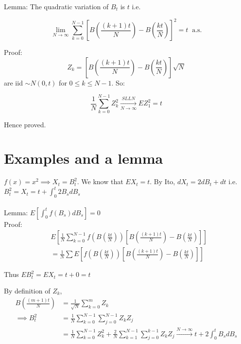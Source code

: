 \documentclass{article}
\begin{document}
Lemma: The quadratic variation of $B_t$ is $t$ i.e.

$$\lim_{N\to \infty} \sum_{k=0}^{N-1}\left[ B\left( \frac{(k+1)t}{N} \right) - B\left( \frac{kt}{N} \right) \right]^2 = t \;\;\text{a.s.}$$

Proof:
$$Z_k = \left[ B\left( \frac{(k+1)t}{N} \right) - B\left( \frac{kt}{N} \right) \right]\sqrt{N}$$ are iid $\sim N(0,t)$ for $0\leq k \leq N-1$. So:

$$\frac{1}{N}\sum_{k=0}^{N-1}Z_k^2 \xrightarrow[N\to \infty]{SLLN} EZ_1^2 = t$$

Hence proved.

\section{Examples and a lemma}
$f(x) = x^2 \implies X_t = B_t^2$. We know that $EX_t = t$. By Ito, $dX_t = 2dB_t + dt$ i.e. $B_t^2 = X_t = t+\int_0^t2B_s dB_s$ \\ \\

Lemma: $E\left[ \int_0^t f(B_s)dB_s \right] = 0$ \\
Proof: 
\begin{align}
    & E\left[ \frac{1}{N}\sum_{k=0}^{N-1}f\left( B\left( \frac{kt}{N}\right)\right)\left[ B\left( \frac{(k+1)t}{N} \right) - B\left( \frac{kt}{N} \right) \right] \right] \\
    &= \frac{1}{N}\sum E\left[ f\left( B\left( \frac{kt}{N}\right)\right)\left[ B\left( \frac{(k+1)t}{N} \right) - B\left( \frac{kt}{N} \right) \right] \right]
\end{align}

Thus $EB_t^2 = EX_t = t+0 = t$

By definition of $Z_k$, 
\begin{align}
B\left( \frac{(m+1)t}{N}\right) &= \frac{1}{\sqrt{N}}\sum_{k=0}^m Z_k \\
\implies B_t^2 &= \frac{1}{N}\sum_{k=0}^{N-1}\sum_{j=0}^{N-1}Z_kZ_j \\
&= \frac{1}{N}\sum_{k=0}^{N-1} Z_k^2 + \frac{2}{N}\sum_{k=1}^{N-1}\sum_{j=0}^{k-1}Z_k Z_j \xrightarrow{N\to \infty} t+2\int_0^t B_s dB_s
\end{align}
\end{document}
